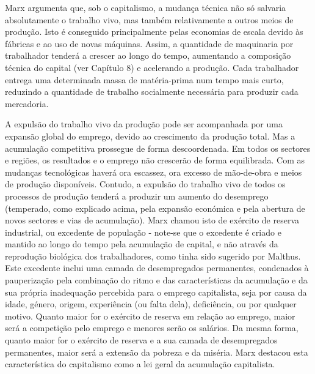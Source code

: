  \par 
Marx argumenta que, sob o capitalismo, a mudança técnica não só salvaria absolutamente o trabalho vivo, mas também relativamente a outros meios de produção. Isto é conseguido principalmente pelas economias de escala devido às fábricas e ao uso de novas máquinas. Assim, a quantidade de maquinaria por trabalhador tenderá a crescer ao longo do tempo, aumentando a composição técnica do capital (ver Capítulo {\color{blue}8}) e acelerando a produção. Cada trabalhador entrega uma determinada massa de matéria-prima num tempo mais curto, reduzindo a quantidade de trabalho socialmente necessária para produzir cada mercadoria.
 \par 
A expulsão do trabalho vivo da produção pode ser acompanhada por uma expansão global do emprego, devido ao crescimento da produção total. Mas a acumulação competitiva prossegue de forma descoordenada. Em todos os sectores e regiões, os resultados e o emprego não crescerão de forma equilibrada. Com as mudanças tecnológicas haverá ora escassez, ora excesso de mão-de-obra e meios de produção disponíveis. Contudo, a expulsão do trabalho vivo de todos os processos de produção tenderá a produzir um aumento do desemprego (temperado, como explicado acima, pela expansão económica e pela abertura de novos sectores e vias de acumulação). Marx chamou isto de exército de reserva industrial, ou excedente de população - note-se que o excedente é criado e mantido ao longo do tempo pela acumulação de capital, e não através da reprodução biológica dos trabalhadores, como tinha sido sugerido por Malthus. Este excedente inclui uma camada de desempregados permanentes, condenados à pauperização pela combinação do ritmo e das características da acumulação e da sua própria inadequação percebida para o emprego capitalista, seja por causa da idade, género, origem, experiência (ou falta dela), deficiência, ou por qualquer motivo. Quanto maior for o exército de reserva em relação ao emprego, maior será a competição pelo emprego e menores serão os salários. Da mesma forma, quanto maior for o exército de reserva e a sua camada de desempregados permanentes, maior será a extensão da pobreza e da miséria. Marx destacou esta característica do capitalismo como a lei geral da acumulação capitalista.
 \par 
